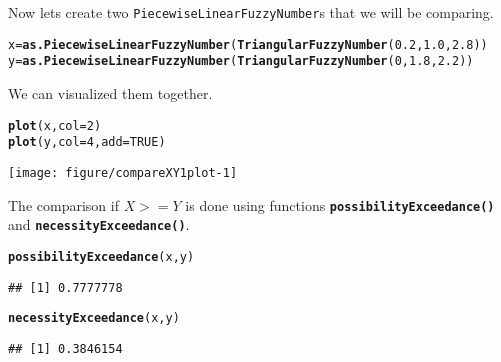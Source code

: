 \documentclass[11pt]{article}\usepackage[]{graphicx}\usepackage[]{color}
\makeatletter
\newcommand{\hlnum}[1]{\textcolor[rgb]{0.686,0.059,0.569}{#1}}%
\newcommand{\hlstd}[1]{\textcolor[rgb]{0.345,0.345,0.345}{#1}}%
\newcommand{\hlkwb}[1]{\textcolor[rgb]{0.69,0.353,0.396}{#1}}%
\newcommand{\hlkwc}[1]{\textcolor[rgb]{0.333,0.667,0.333}{#1}}%
\newcommand{\hlkwd}[1]{\textcolor[rgb]{0.737,0.353,0.396}{\textbf{#1}}}%
\newenvironment{kframe}{%
 \def\at@end@of@kframe{}%
 \ifinner\ifhmode%
  \def\at@end@of@kframe{\end{minipage}}%
  \begin{minipage}{\columnwidth}%
 \fi\fi%
 \def\FrameCommand##1{\hskip\@totalleftmargin \hskip-\fboxsep
 \colorbox{shadecolor}{##1}\hskip-\fboxsep
     \hskip-\linewidth \hskip-\@totalleftmargin \hskip\columnwidth}%
 \MakeFramed {\advance\hsize-\width
   \@totalleftmargin\z@ \linewidth\hsize
   \@setminipage}}%
 {\par\unskip\endMakeFramed%
 \at@end@of@kframe}
\newenvironment{knitrout}{}{} %
\newcommand{\func}[1]{\texttt{\hlkwd{#1}}}
\makeatother
\begin{document}
Now lets create two \texttt{PiecewiseLinearFuzzyNumber}s that we will be comparing.
\begin{knitrout}\small
{}\color{fgcolor}\begin{kframe}
\begin{alltt}
\hlstd{x} \hlkwb{=} \hlkwd{as.PiecewiseLinearFuzzyNumber}\hlstd{(}\hlkwd{TriangularFuzzyNumber}\hlstd{(}\hlnum{0.2}\hlstd{,} \hlnum{1.0}\hlstd{,} \hlnum{2.8}\hlstd{))}
\hlstd{y} \hlkwb{=} \hlkwd{as.PiecewiseLinearFuzzyNumber}\hlstd{(}\hlkwd{TriangularFuzzyNumber}\hlstd{(}\hlnum{0}\hlstd{,} \hlnum{1.8}\hlstd{,} \hlnum{2.2}\hlstd{))}
\end{alltt}
\end{kframe}
\end{knitrout}
We can visualized them together.
\begin{knitrout}\small
{}\color{fgcolor}\begin{kframe}
\begin{alltt}
\hlkwd{plot}\hlstd{(x,} \hlkwc{col}\hlstd{=}\hlnum{2}\hlstd{)}
\hlkwd{plot}\hlstd{(y,} \hlkwc{col}\hlstd{=}\hlnum{4}\hlstd{,} \hlkwc{add}\hlstd{=}\hlnum{TRUE}\hlstd{)}
\end{alltt}
\end{kframe}

{\centering \texttt{[image: figure/compareXY1plot-1]} 

}



\end{knitrout}
The comparison if $X>=Y$ is done using functions \func{possibilityExceedance()} and \func{necessityExceedance()}.
\begin{knitrout}\small
{}\color{fgcolor}\begin{kframe}
\begin{alltt}
\hlkwd{possibilityExceedance}\hlstd{(x,y)}
\end{alltt}
\begin{verbatim}
## [1] 0.7777778
\end{verbatim}
\begin{alltt}
\hlkwd{necessityExceedance}\hlstd{(x,y)}
\end{alltt}
\begin{verbatim}
## [1] 0.3846154
\end{verbatim}
\end{kframe}
\end{knitrout}
\end{document}
